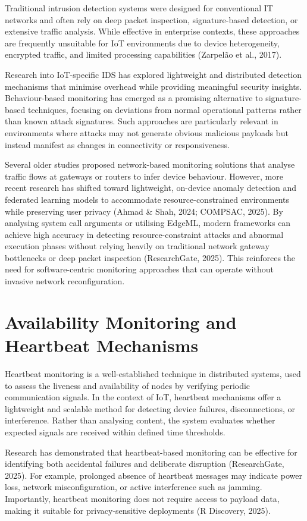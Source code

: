 Traditional intrusion detection systems were designed for conventional IT networks and often rely on deep packet inspection, signature-based detection, or extensive traffic analysis. While effective in enterprise contexts, these approaches are frequently unsuitable for IoT environments due to device heterogeneity, encrypted traffic, and limited processing capabilities (Zarpelão et al., 2017).

Research into IoT-specific IDS has explored lightweight and distributed detection mechanisms that minimise overhead while providing meaningful security insights. Behaviour-based monitoring has emerged as a promising alternative to signature-based techniques, focusing on deviations from normal operational patterns rather than known attack signatures. Such approaches are particularly relevant in environments where attacks may not generate obvious malicious payloads but instead manifest as changes in connectivity or responsiveness.

Several older studies proposed network-based monitoring solutions that analyse traffic flows at gateways or routers to infer device behaviour. However, more recent research has shifted toward lightweight, on-device anomaly detection and federated learning models to accommodate resource-constrained environments while preserving user privacy (Ahmad \& Shah, 2024; COMPSAC, 2025). By analysing system call arguments or utilising EdgeML, modern frameworks can achieve high accuracy in detecting resource-constraint attacks and abnormal execution phases without relying heavily on traditional network gateway bottlenecks or deep packet inspection (ResearchGate, 2025). This reinforces the need for software-centric monitoring approaches that can operate without invasive network reconfiguration.

\section{Availability Monitoring and Heartbeat Mechanisms}

Heartbeat monitoring is a well-established technique in distributed systems, used to assess the liveness and availability of nodes by verifying periodic communication signals. In the context of IoT, heartbeat mechanisms offer a lightweight and scalable method for detecting device failures, disconnections, or interference. Rather than analysing content, the system evaluates whether expected signals are received within defined time thresholds.

Research has demonstrated that heartbeat-based monitoring can be effective for identifying both accidental failures and deliberate disruption (ResearchGate, 2025). For example, prolonged absence of heartbeat messages may indicate power loss, network misconfiguration, or active interference such as jamming. Importantly, heartbeat monitoring does not require access to payload data, making it suitable for privacy-sensitive deployments (R Discovery, 2025).

